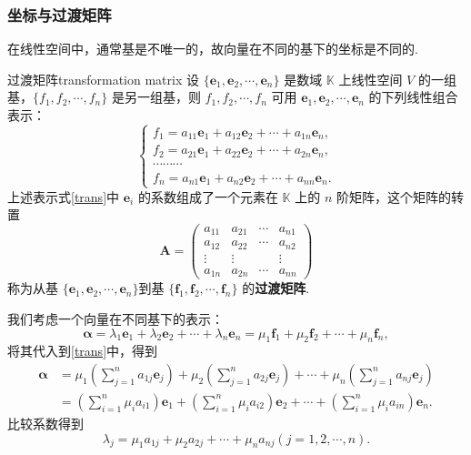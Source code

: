\documentclass[12pt, a4paper,newtx]{ctexart}
\begin{document}
\subsubsection{坐标与过渡矩阵}
在线性空间中，通常基是不唯一的，故向量在不同的基下的坐标是不同的. \begin{definition}{过渡矩阵}{transformation matrix}
	设 $\{\bm{e}_1, \bm{e}_2, \cdots, \bm{e}_n\}$ 是数域 $\mathbb{K}$ 上线性空间 $V$ 的一组基，$\{f_1, f_2, \cdots, f_n\}$ 是另一组基，则 $f_1, f_2, \cdots, f_n$ 可用 $\bm{e}_1, \bm{e}_2, \cdots, \bm{e}_n$ 的下列线性组合表示：
	\begin{equation}\label{trans}
		\begin{cases}
			f_1 = a_{11}\bm{e}_1 + a_{12}\bm{e}_2 + \cdots + a_{1n}\bm{e}_n, \\
			f_2 = a_{21}\bm{e}_1 + a_{22}\bm{e}_2 + \cdots + a_{2n}\bm{e}_n, \\
			\cdots \cdots \cdots \\
			f_n = a_{n1}\bm{e}_1 + a_{n2}\bm{e}_2 + \cdots + a_{nn}\bm{e}_n.
		\end{cases}
	\end{equation}
	上述表示式\eqref{trans}中 $\bm{e}_i$ 的系数组成了一个元素在 $\mathbb{K}$ 上的 $n$ 阶矩阵，这个矩阵的转置
	\[
	\bm{A} = \begin{pmatrix}
		a_{11} & a_{21} & \cdots & a_{n1} \\
		a_{12} & a_{22} & \cdots & a_{n2} \\
		\vdots & \vdots & & \vdots \\
		a_{1n} & a_{2n} & \cdots & a_{nn}
	\end{pmatrix}
	\]
	称为从基 $\{\bm{e}_1, \bm{e}_2, \cdots, \bm{e}_n\}$到基 $\{\bm f_1, \bm f_2, \cdots, \bm f_n\}$ 的\textbf{过渡矩阵}. 
\end{definition}
我们考虑一个向量在不同基下的表示：
\[
\bm\alpha = \lambda_1 \bm e_1 + \lambda_2 \bm e_2 + \cdots + \lambda_n \bm e_n = \mu_1 \bm f_1 + \mu_2 \bm f_2 + \cdots + \mu_n \bm f_n,
\]将其代入到\eqref{trans}中，得到\begin{align*}
	\bm\alpha &= \mu_1 \left( \sum_{j=1}^{n} a_{1j} \bm e_j \right) + \mu_2 \left( \sum_{j=1}^{n} a_{2j} \bm e_j \right) + \cdots + \mu_n \left( \sum_{j=1}^{n} a_{nj} \bm e_j \right)\\&= \left( \sum_{i=1}^{n} \mu_i a_{i1} \right) \bm e_1 + \left( \sum_{i=1}^{n} \mu_i a_{i2} \right) \bm e_2 + \cdots + \left( \sum_{i=1}^{n} \mu_i a_{in} \right) \bm e_n.
\end{align*}
比较系数得到\begin{equation}\label{trans-}
	\lambda_j=\mu_1a_{1j}+\mu_2a_{2j}+\cdots+\mu_na_{nj}(j=1,2,\cdots,n).
\end{equation}
\end{document}
